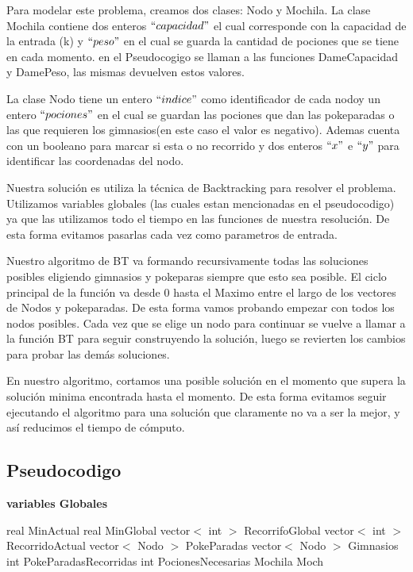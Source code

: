 \documentclass[spanish,12pt]{article}
\begin{document}
Para modelar este problema, creamos dos clases: Nodo y Mochila.
La clase Mochila contiene dos enteros $``capacidad"$ el cual corresponde con la capacidad de la entrada (k) y $``peso"$ en el cual se guarda la cantidad de pociones que se tiene en cada momento. 
en el Pseudocogigo se llaman a las funciones DameCapacidad y DamePeso, las mismas devuelven estos valores.

La clase Nodo tiene  un entero $``indice"$ como identificador de cada nodoy un entero $``pociones"$ en el cual se guardan las pociones que dan las pokeparadas o las que requieren los gimnasios(en este caso el valor es negativo). Ademas cuenta con un booleano para marcar si esta o no recorrido y dos enteros $``x"$ e $``y"$ para identificar las coordenadas del nodo.

Nuestra solución es utiliza la técnica de Backtracking para resolver el problema. Utilizamos variables globales (las cuales estan mencionadas en el pseudocodigo) ya que las utilizamos todo el tiempo en las funciones de nuestra resolución. De esta forma evitamos pasarlas cada vez como parametros de entrada.

Nuestro algoritmo de BT va formando recursivamente todas las soluciones posibles eligiendo gimnasios y pokeparas siempre que esto sea posible. El ciclo principal de la función va desde 0 hasta el Maximo entre el largo de los vectores de Nodos y pokeparadas. De esta forma vamos probando empezar con todos los nodos posibles. Cada vez que se elige un nodo para continuar se vuelve a llamar a la función BT para seguir construyendo la solución, luego se revierten los cambios para probar las demás soluciones. 

En nuestro algoritmo, cortamos una posible solución en el momento que supera la solución minima encontrada hasta el momento. De esta forma evitamos seguir ejecutando el algoritmo para una solución que claramente no va a ser la mejor, y así reducimos el tiempo de cómputo.


\subsection{Pseudocodigo}

\begin{algorithm}[H]{\textbf{variables Globales}}
	\begin{algorithmic}[1]
		\State real MinActual 
		\State real MinGlobal
		\State vector$<$ int $>$ RecorrifoGlobal
		\State vector$<$ int $>$ RecorridoActual
		\State vector$<$ Nodo $>$ PokeParadas
		\State vector$<$ Nodo $>$ Gimnasios
		\State int PokeParadasRecorridas
		\State int PocionesNecesarias		
		\State Mochila Moch		
	
	\end{algorithmic}
\end{algorithm}
\end{document}
